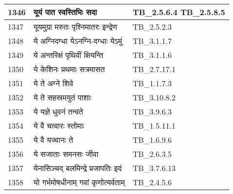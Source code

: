 \documentclass[17pt]{extarticle}
\begin{document}
\begin{longtable}{||p{0.4in}||p{4.9in}||p{0.9in}||}
    \hline
        
    1346 & यूयं पात स्वस्तिभिः सदा & TB\_2.5.6.4 TB\_2.5.8.5       \\
    
    \hline
        
    1347 & यूयमुग्रा मरुतः पृश्निमातरः इन्द्रेण & TB\_2.5.2.3       \\
    
    \hline
        
    1348 & ये अग्निदग्धा येऽनग्नि{-}दग्धाः येऽमुं & TB\_3.1.1.7       \\
    
    \hline
        
    1349 & ये अन्तरिक्षं पृथिवीं क्षियन्ति & TB\_3.1.1.6       \\
    
    \hline
        
    1350 & ये केशिनः प्रथमाः सत्रमासत & TB\_2.7.17.1       \\
    
    \hline
        
    1351 & ये ते अग्ने शिवे & TB\_1.1.7.3       \\
    
    \hline
        
    1352 & ये ते सहस्रमयुतं पाशाः & TB\_3.10.8.2       \\
    
    \hline
        
    1353 & ये यज्ञे धुवनं तन्वते & TB\_3.9.6.3       \\
    
    \hline
        
    1354 & ये वै चत्वारः स्तोमाः & TB\_1.5.11.1       \\
    
    \hline
        
    1355 & ये वै यज्वानः ते & TB\_1.6.9.6       \\
    
    \hline
        
    1356 & ये सजाताः समनसः जीवा & TB\_2.6.3.5       \\
    
    \hline
        
    1357 & येनासिञ्चद् बलमिन्द्रे प्रजापतिः इदं & TB\_3.7.6.13       \\
    
    \hline
        
    1358 & यो गर्भमोषधीनाम् गवां कृणोत्यर्वताम् & TB\_2.4.5.6       \\
    

\end{longtable}
\end{document}
